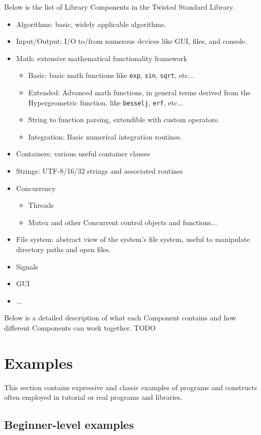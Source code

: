 \documentclass[a4paper,11pt]{article}
\newcommand{\tcode}[1]{\texttt{#1}}
\begin{document}
Below is the list of Library Components in the Twisted Standard Library.
\begin{itemize}
  \item Algorithms: basic, widely applicable algorithms.
  \item Input/Output: I/O to/from numerous devices like GUI, files, and console.
  \item Math: extensive mathematical functionality framework
  \begin{itemize}
    \item Basic: basic math functions like \tcode{exp}, \tcode{sin}, \tcode{sqrt}, etc...
    \item Extended: Advanced math functions, in general terms derived from the Hypergeometric function, like \tcode{besselj}, \tcode{erf}, etc...
    \item String to function parsing, extendible with custom operators.
    \item Integration: Basic numerical integration routines.
  \end{itemize}
  \item Containers: various useful container classes
  \item Strings: UTF-8/16/32 strings and associated routines
  \item Concurrency
  \begin{itemize}
    \item Threads
    \item Mutex and other Concurrent control objects and functions...
  \end{itemize}
  \item File system: abstract view of the system's file system, useful to manipulate directory paths and open files.
  \item Signals
  \item GUI
  \item ...
\end{itemize}
Below is a detailed description of what each Component contains and how different Components can work together.
TODO

\section{Examples}
This section contains expressive and classic examples of programs and constructs often employed in tutorial or real programs and libraries.

  \subsection{Beginner-level examples}
\end{document}
